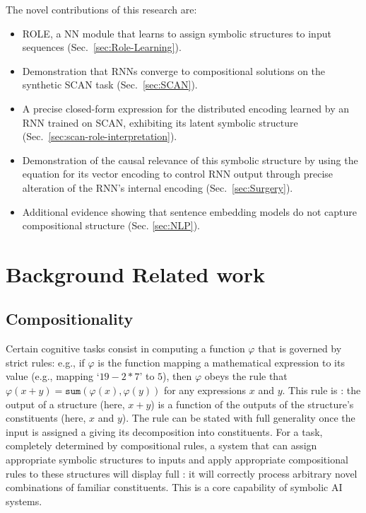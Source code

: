 The novel contributions of this research are:
\begin{itemize}
  \vspace{-2mm}
  \item ROLE, a NN module that learns to assign symbolic structures to input sequences (Sec.~\ref{sec:Role-Learning}).
  \vspace{-2mm}
  \item Demonstration that RNNs converge to compositional solutions on the synthetic SCAN task (Sec.~\ref{sec:SCAN}).
  \vspace{-2mm}
  \item A precise closed-form expression for the distributed encoding learned by an RNN trained on SCAN, exhibiting its latent symbolic structure (Sec.~\ref{sec:scan-role-interpretation}).
  \vspace{-2mm}
  \item Demonstration of the causal relevance of this symbolic structure by using the equation for its vector encoding to control RNN output through precise alteration of the RNN's internal encoding (Sec.~\ref{sec:Surgery}).
  \vspace{-2mm}
  \item Additional evidence showing that sentence embedding models do not capture compositional structure (Sec. \ref{sec:NLP}).
\end{itemize}

\section{Background Related work} \label{sec:Related}

\subsection{Compositionality}

Certain cognitive tasks consist in computing a function $\varphi$ that is governed by strict rules: e.g., if $\varphi$ is the function mapping a mathematical expression to its value (e.g., mapping `$19 - 2 * 7$' to $5$), then $\varphi$ obeys the rule that $\varphi(x + y) = \mathtt{sum}(\varphi(x), \varphi(y))$ for any expressions $x$ and $y$.
This rule is : the output of a structure (here, $x + y$) is a function of the outputs of the structure's constituents (here, $x$ and $y$). The rule can be stated with full generality once the input is assigned a  giving its decomposition into constituents. 
For a  task, completely determined by compositional rules, a system that can assign appropriate symbolic structures to inputs and apply appropriate compositional rules to these structures will display full : it will correctly process arbitrary novel combinations of familiar constituents. This is a core capability of symbolic AI systems.

